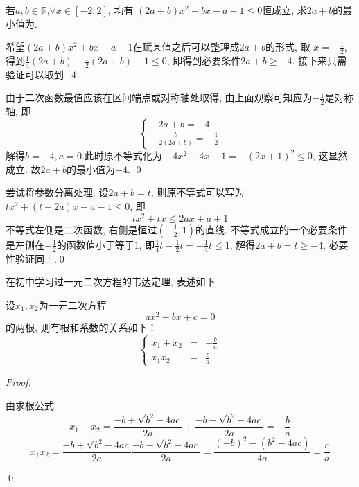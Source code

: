 \clearpage
\begin{example}[2025年天津卷15]\label{高考:2025年天津卷15}
    若\(a,b\in\mathbb{R}\),\(\forall x\in [-2,2]\), 均有
        \((2a+b)x^2+bx-a-1\leq 0\)恒成立, 求\(2a+b\)的最小值为\uline{\makebox[1.5cm]{}}.
\end{example}
\begin{jie}
    \begin{way1}
        希望$(2a+b)x^2+bx-a-1$在赋某值之后可以整理成\(2a+b\)的形式, 取 
        \(x=-\frac{1}{2}\), 得到\(\frac{1}{4}(2a+b)-\frac{1}{2}(2a+b)-1\leq 0\),
        即得到必要条件\(2a+b\geq -4\). 接下来只需验证可以取到\(-4\).

        由于二次函数最值应该在区间端点或对称轴处取得, 由上面观察可知应为\(-\frac{1}{2}\)是对称轴, 即 
        \[\left\{\begin{aligned}
            &2a+b=-4\\
            &\frac{b}{2(2a+b)}=-\frac{1}{2}
        \end{aligned}\right.\]
        解得\(b=-4,a=0\).此时原不等式化为
        \(-4x^2-4x-1=-(2x+1)^2\leq 0\), 这显然成立. 故\(2a+b\)的最小值为\(-4\). \qed
    \end{way1}
    \begin{way2}尝试将参数分离处理.
        设\(2a+b=t\), 则原不等式可以写为
        \(tx^2+(t-2a)x-a-1\leq 0\),
        即\[tx^2+tx\leq 2ax+a+1\]
        不等式左侧是二次函数, 右侧是恒过\((-\frac{1}{2},1)\)的直线.
        不等式成立的一个必要条件是左侧在\(-\frac{1}{2}\)的函数值小于等于\(1\),
        即\(\frac{1}{4}t-\frac{1}{2}t=-\frac{1}{4}t\leq 1\),  
        解得\(2a+b=t\geq -4\), 必要性验证同上.\qed
    \end{way2}
\end{jie}








\clearpage
在初中学习过一元二次方程的韦达定理, 表述如下
\begin{theorem}[Vieta定理]\label{thm:Vieta定理}
    设\(x_1,x_2\)为一元二次方程\[ax^2+bx+c=0\]的两根, 则有根和系数的关系如下：
    \[
\left\{
\begin{array}{ccc}
  x_1 + x_2 & = &\displaystyle -\frac{b}{a} \\
  x_1 x_2   & = &\displaystyle \frac{c}{a}
\end{array}
\right.
\]%
 
\end{theorem}
\begin{proof}
    \begin{way1}
        由求根公式
        \[x_1+x_2=\frac{-b+ \sqrt{b^2-4ac}}{2a}+\frac{-b-\sqrt{b^2-4ac}}{2a}=-\frac{b}{a}\]
        \[x_1x_2=\frac{-b+ \sqrt{b^2-4ac}}{2a}\frac{-b-\sqrt{b^2-4ac}}{2a}=\frac{(-b)^2-(b^2-4ac)}{4a}=\frac{c}{a}\]
    \end{way1}
    \begin{way2}

    \end{way2}

    \qed
\end{proof}

